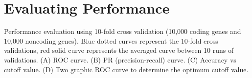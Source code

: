 \documentclass[letterpaper,10pt,english]{sphinxmanual}
\begin{document}
\chapter{Evaluating Performance}
\label{index:evaluating-performance}
Performance evaluation using 10-fold cross validation (10,000 coding genes and 10,000 noncoding genes). Blue dotted curves represent the
10-fold cross validations, red solid curve represents the averaged curve between 10 runs of
validations. (A) ROC curve. (B) PR (precision-recall) curve. (C) Accuracy vs cutoff value.
(D) Two graphic ROC curve to determine the optimum cutoff value.
\begin{figure}[htbp]
\centering

\end{figure}
\end{document}
